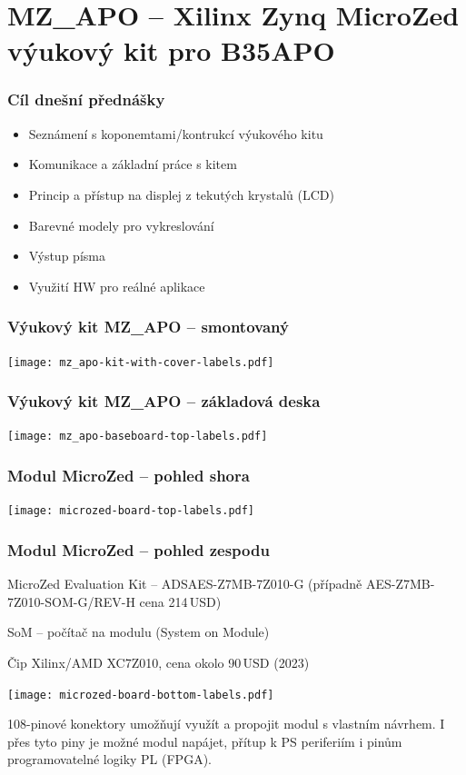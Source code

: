 \documentclass{beamer}
\subtitle{Lekce 08. Výukový kit MZ\_APO (Xilinx Zynq MicroZed APO)}
\author{Pavel Píša \phantom{xxxxxxxxx} Petr Štěpán \\ \small\texttt{pisa@fel.cvut.cz}\phantom{xxxx}\small\texttt{stepan@fel.cvut.cz}}
\begin{document}
\maketitle

\section{MZ\_APO -- Xilinx Zynq MicroZed výukový kit pro B35APO}

\begin{frame}
\frametitle{Cíl dnešní přednášky}

\begin{itemize}
 \item Seznámení s koponemtami/kontrukcí výukového kitu
 \item Komunikace a základní práce s kitem
 \item Princip a přístup na displej z tekutých krystalů (LCD)
 \item Barevné modely pro vykreslování
 \item Výstup písma
 \item Využití HW pro reálné aplikace
\end{itemize}
\end{frame}

\begin{frame}
\frametitle{Výukový kit MZ\_APO -- smontovaný}

\texttt{[image: mz\_apo-kit-with-cover-labels.pdf]}

\end{frame}

\begin{frame}
\frametitle{Výukový kit MZ\_APO -- základová deska}

\texttt{[image: mz\_apo-baseboard-top-labels.pdf]}

\end{frame}

\begin{frame}
\frametitle{Modul MicroZed -- pohled shora}

\texttt{[image: microzed-board-top-labels.pdf]}

\end{frame}

\begin{frame}
\frametitle{Modul MicroZed -- pohled zespodu}

MicroZed Evaluation Kit -- ADSAES-Z7MB-7Z010-G (případně AES-Z7MB-7Z010-SOM-G/REV-H cena 214\,USD)
\par
SoM -- počítač na modulu (System on Module)
\par
Čip Xilinx/AMD XC7Z010, cena okolo 90\,USD (2023)
\par
\texttt{[image: microzed-board-bottom-labels.pdf]}
\par
108-pinové konektory umožňují využít a propojit modul s vlastním návrhem. I přes tyto piny je možné modul napájet,
přítup k PS periferiím i pinům programovatelné logiky PL (FPGA).

\end{frame}
\end{document}

